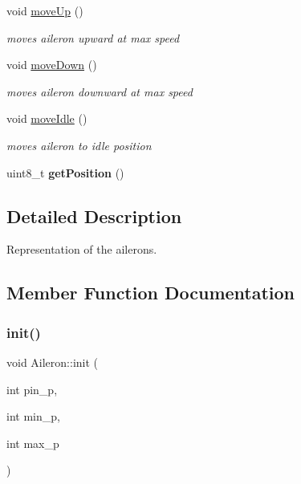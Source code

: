 \begin{DoxyCompactItemize}
void \hyperlink{class_aileron_abeee29a990a1a9b3d8bc884991b7221f}{move\+Up} ()
\begin{DoxyCompactList}\small\item\em moves aileron upward at max speed \end{DoxyCompactList}\item 
\mbox{\label{class_aileron_a7c4b7d445e5b0b7469e819e5068db841}} 
void \hyperlink{class_aileron_a7c4b7d445e5b0b7469e819e5068db841}{move\+Down} ()
\begin{DoxyCompactList}\small\item\em moves aileron downward at max speed \end{DoxyCompactList}\item 
\mbox{\label{class_aileron_a52f780193672d894137866203860f817}} 
void \hyperlink{class_aileron_a52f780193672d894137866203860f817}{move\+Idle} ()
\begin{DoxyCompactList}\small\item\em moves aileron to idle position \end{DoxyCompactList}\item 
\mbox{\label{class_aileron_a2eaf14f5794bb55035b19499f0c1ec6c}} 
uint8\+\_\+t {\bfseries get\+Position} ()
\end{DoxyCompactItemize}


\subsection{Detailed Description}
Representation of the ailerons. 

\subsection{Member Function Documentation}
\mbox{\label{class_aileron_ad28b0e5e53705b1f43a3fa73c0765a96}} 
\subsubsection{\texorpdfstring{init()}{init()}}
{\footnotesize\ttfamily void Aileron\+::init (\begin{DoxyParamCaption}\item[{int}]{pin\+\_\+p,  }\item[{int}]{min\+\_\+p,  }\item[{int}]{max\+\_\+p }\end{DoxyParamCaption})}



